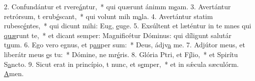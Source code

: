 2. Confundántur et rvere\uline{á}ntur,~* qui quærunt ánimm m\uline{e}am.
3. Avertántur retrórsum, t erub\uline{é}scant,~* qui volunt mih m\uline{a}la.
4. Avertántur statim rubesc\uline{é}ntes,~* qui dicunt mihi: Eug, \uline{e}uge.
5. Exsúltent et læténtur in te mnes qui \uline{quæ}runt te,~* et dicant semper: Magnificétur Dóminus: qui díligunt salutár t\uline{u}um.
6. Ego vero egnus, et p\uline{au}per sum:~* Deus, ádjv\uline{a} me.
7. Adjútor meus, et liberátr meus \uline{e}s tu:~* Dómine, ne mr\uline{é}ris.
8. Glória Ptri, et F\uline{í}lio,~* et Spirítu S\uline{a}ncto.
9. Sicut erat in princípio, t nunc, et s\uline{e}mper,~* et in sǽcula sæculórm. \uline{A}men.
